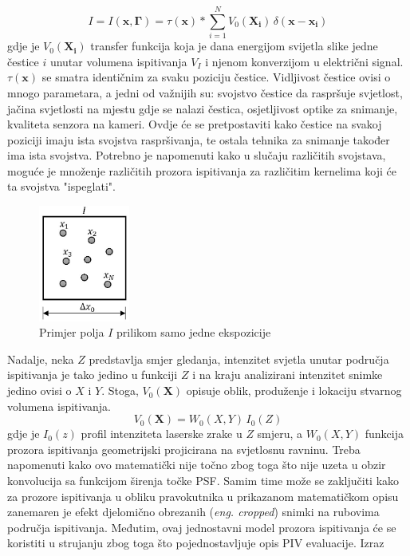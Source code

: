 \begin{equation}
	I = I (\boldsymbol{x}, \boldsymbol{\Gamma}) = \tau (\boldsymbol{x}) \ast \sum_{i=1}^{N}V_{0}(\boldsymbol{X_{i}}) \, \delta (\boldsymbol{x}-\boldsymbol{x_{i}})
	\label{eqn:3.5}
\end{equation}
gdje je $V_{0} (\boldsymbol{X_{i}})$ transfer funkcija koja je dana energijom svijetla slike jedne čestice $i$ unutar volumena ispitivanja $V_{I}$  i njenom konverzijom u električni signal. $\tau (\boldsymbol{x})$ se smatra identičnim za svaku poziciju čestice. Vidljivost čestice ovisi o mnogo parametara, a jedni od važnijih su: svojstvo čestice da raspršuje svjetlost, jačina svjetlosti na mjestu gdje se nalazi čestica, osjetljivost optike za snimanje, kvaliteta senzora na kameri. Ovdje će se pretpostaviti kako čestice na svakoj poziciji imaju ista svojstva raspršivanja, te ostala tehnika za snimanje također ima ista svojstva. Potrebno je napomenuti kako u slučaju različitih svojstava, moguće je množenje različitih prozora ispitivanja za različitim kernelima koji će ta svojstva "ispeglati".
\begin{figure}[h]  
	\centering
	\includegraphics[width=3cm]{./3_MatPozadina/3_3primjerPoljaCestica.jpg} 
	\caption{Primjer polja $I$ prilikom samo jedne ekspozicije}
	\label{sl:3.3}
\end{figure}
\par
Nadalje, neka $Z$ predstavlja smjer gledanja, intenzitet svjetla unutar područja ispitivanja je tako jedino u funkciji $Z$ i na kraju analizirani intenzitet snimke jedino ovisi o $X$ i $Y$. Stoga, $V_{0} (\boldsymbol{X})$ opisuje oblik, produženje i lokaciju stvarnog volumena ispitivanja.
\begin{equation}
	V_{0}(\boldsymbol{X}) = W_{0}(X, Y)\, I_{0}(Z)
	\label{eqn:3.6}
\end{equation}
gdje je $I_{0}(z)$ profil intenziteta laserske zrake u $Z$ smjeru, a $W_{0}(X, Y)$ funkcija prozora ispitivanja geometrijski projicirana na svjetlosnu ravninu. Treba napomenuti kako ovo matematički nije točno zbog toga što nije uzeta u obzir konvolucija sa funkcijom širenja točke PSF. Samim time može se zaključiti kako za prozore ispitivanja u obliku pravokutnika u prikazanom matematičkom opisu zanemaren je efekt djelomično obrezanih (\textit{eng. cropped}) snimki na rubovima područja ispitivanja. Međutim, ovaj jednostavni model prozora ispitivanja će se koristiti u strujanju zbog toga što pojednostavljuje opis PIV evaluacije. Izraz
